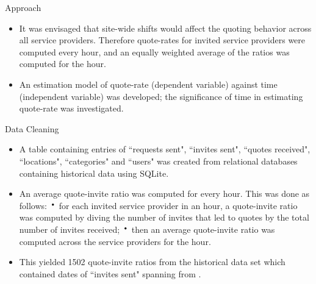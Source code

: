 \documentclass{beamer}
\newcommand*{\LargerCdot}{\raisebox{-0.25ex}{\scalebox{2.3}{$\cdot$}}}
\begin{document}
\begin{frame}{Approach}{}
	\begin{itemize}
			
		\item{It was envisaged that site-wide shifts would affect the quoting behavior across all service providers. Therefore quote-rates for invited service providers were computed every hour, and an equally weighted average of the ratios was computed for the hour.} \vspace{0.5in}	
		
		\item{An estimation model of quote-rate (dependent variable) against time (independent variable) was developed; the significance of time in estimating quote-rate was investigated.} \vspace{0.5 in}
		
	\end{itemize}
\end{frame}

\begin{frame}{Data Cleaning}{}
	\begin{itemize}
		\item{A table containing entries of ``requests sent", ``invites sent", ``quotes received", ``locations", ``categories" and ``users"  was created from relational databases containing historical data using SQLite.}\vspace{0.1 in}
		\item{An average quote-invite ratio was computed for every hour. This was done as follows:} \newline
		{$\LargerCdot$ for each invited service provider in an hour, a quote-invite ratio was computed by diving the number of invites that led to quotes by the total number of invites received;}\newline 
		{$\LargerCdot$ then an average quote-invite ratio was computed across the service providers for the hour.}\newline
		\item{ This yielded  {\color{blue}1502} quote-invite ratios from the historical data set which contained dates of ``invites sent" spanning from {\color{blue}{1 July 2013 - 2 September 2013}}.}
		\end{itemize}
\end{frame}
\end{document}
